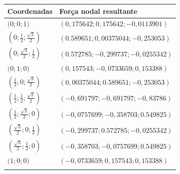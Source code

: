 \documentclass[Tese.tex]{subfiles}
\begin{document}
\begin{table}[!htb]
{\begin{tabular}{ll}
			Coordenadas & Força nodal resultante \\ \hline
			$\Big(0; 0; 1\Big)$  & $\left(0,175642; 0,175642; -0,0113901\right)$  \\
			$\left(0; \frac{1}{2}; \frac{\sqrt{3}}{2}\right)$ & $\left(0.589651; 0,00375044; -0,253053\right)$ \\
			$\left(0; \frac{\sqrt{3}}{2}; \frac{1}{2}\right)$ & $\left(0.572785; -0,299737; -0,0255342\right)$ \\
			$\Big(0; 1; 0\Big)$ & $\left(0,157543; -0,0733659; 0,153388\right)$ \\
			$\left(\frac{1}{2}; 0; \frac{\sqrt{3}}{2}\right)$ & $\left(0,00375044; 0.589651; -0,253053\right)$ \\
			$\left(\frac{1}{2}; \frac{1}{2}; \frac{\sqrt{2}}{2}\right)$ & $\left(-0,691797; -0,691797; -0,83786\right)$ \\
			$\left(\frac{1}{2}; \frac{\sqrt{3}}{2}; 0\right)$ & $\left(-0,0757699; -0,358703; 0.549825\right)$ \\
			$\left(\frac{\sqrt{3}}{2}; 0; \frac{1}{2}\right)$ & $\left(-0,299737; 0.572785; -0,0255342\right)$ \\
			$\left(\frac{\sqrt{3}}{2}; \frac{1}{2}; 0\right)$ & $\left(-0,358703; -0,0757699; 0.549825\right)$ \\
			$\Big(1; 0; 0\Big)$ & $\left(-0,0733659; 0,157543; 0,153388\right)$ \\ \hline
			& \\[0.15cm]
		\end{tabular}
	}
\end{table}
\end{document}
